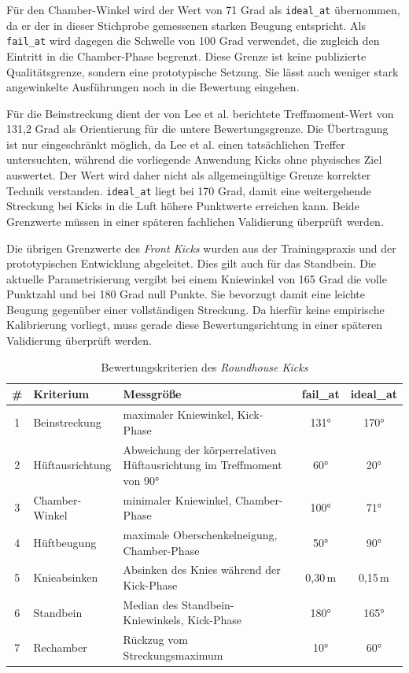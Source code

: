 \documentclass[intern]{cgMA}
\begin{document}
Für den Chamber-Winkel wird der Wert von 71 Grad als \texttt{ideal\_at} übernommen, da er der in dieser Stichprobe gemessenen starken Beugung entspricht. Als \texttt{fail\_at} wird dagegen die Schwelle von 100 Grad verwendet, die zugleich den Eintritt in die Chamber-Phase begrenzt. Diese Grenze ist keine publizierte Qualitätsgrenze, sondern eine prototypische Setzung. Sie lässt auch weniger stark angewinkelte Ausführungen noch in die Bewertung eingehen.

Für die Beinstreckung dient der von Lee et al. berichtete Treffmoment-Wert von 131,2 Grad als Orientierung für die untere Bewertungsgrenze. Die Übertragung ist nur eingeschränkt möglich, da Lee et al. einen tatsächlichen Treffer untersuchten, während die vorliegende Anwendung Kicks ohne physisches Ziel auswertet. Der Wert wird daher nicht als allgemeingültige Grenze korrekter Technik verstanden. \texttt{ideal\_at} liegt bei 170 Grad, damit eine weitergehende Streckung bei Kicks in die Luft höhere Punktwerte erreichen kann. Beide Grenzwerte müssen in einer späteren fachlichen Validierung überprüft werden.

Die übrigen Grenzwerte des \textit{Front Kicks} wurden aus der Trainingspraxis und der prototypischen Entwicklung abgeleitet. Dies gilt auch für das Standbein. Die aktuelle Parametrisierung vergibt bei einem Kniewinkel von 165 Grad die volle Punktzahl und bei 180 Grad null Punkte. Sie bevorzugt damit eine leichte Beugung gegenüber einer vollständigen Streckung. Da hierfür keine empirische Kalibrierung vorliegt, muss gerade diese Bewertungsrichtung in einer späteren Validierung überprüft werden.

\begin{table}[htbp]
\centering
\small
\begin{tabular}{c p{} p{} c c}
\hline
\# & \textbf{Kriterium} & \textbf{Messgröße} & \textbf{fail\_at} & \textbf{ideal\_at} \\ \hline
1 & Beinstreckung & maximaler Kniewinkel, Kick-Phase & 131° & 170° \\
2 & Hüftausrichtung & Abweichung der körperrelativen Hüftausrichtung im Treffmoment von 90° & 60° & 20° \\
3 & Chamber-Winkel & minimaler Kniewinkel, Chamber-Phase & 100° & 71° \\
4 & Hüftbeugung & maximale Oberschenkelneigung, Chamber-Phase & 50° & 90° \\
5 & Knieabsinken & Absinken des Knies während der Kick-Phase & 0,30\,m & 0,15\,m \\
6 & Standbein & Median des Standbein-Kniewinkels, Kick-Phase & 180° & 165° \\
7 & Rechamber & Rückzug vom Streckungsmaximum & 10° & 60° \\ \hline
\end{tabular}
\caption{Bewertungskriterien des \textit{Roundhouse Kicks}}
\label{tab:crit_round}
\end{table}
\end{document}

